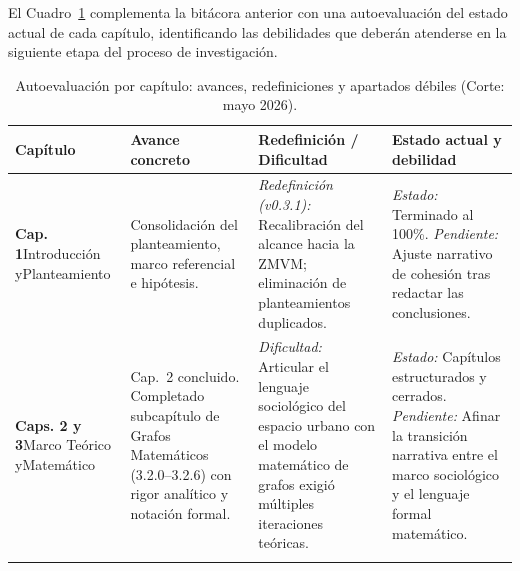 El Cuadro~\ref{tab:autoevaluacion} complementa la bitácora anterior con una
autoevaluación del estado actual de cada capítulo, identificando las debilidades
que deberán atenderse en la siguiente etapa del proceso de investigación.

\begin{table}[H]
    \centering
    \caption{Autoevaluación por capítulo: avances, redefiniciones y apartados débiles (Corte: mayo 2026).}
    \label{tab:autoevaluacion}
    \fontsize{9pt}{11.5pt}\selectfont
    \begin{tabularx}{\textwidth}{
        >{\hsize=0.55\hsize\raggedright\arraybackslash}X
        >{\hsize=1.15\hsize\raggedright\arraybackslash}X
        >{\hsize=1.15\hsize\raggedright\arraybackslash}X
        >{\hsize=1.15\hsize\raggedright\arraybackslash}X}
        \toprule
        \textbf{Capítulo} &
        \textbf{Avance concreto} &
        \textbf{Redefinición / Dificultad} &
        \textbf{Estado actual y debilidad} \\
        \midrule

        \textbf{Cap. 1}\newline Introducción y\newline Planteamiento &
        Consolidación del planteamiento, marco referencial e hipótesis. &
        \textit{Redefinición (v0.3.1):} Recalibración del alcance hacia la ZMVM;
        eliminación de planteamientos duplicados. &
        \textit{Estado:} Terminado al 100\%. \newline
        \textit{Pendiente:} Ajuste narrativo de cohesión tras redactar las conclusiones. \\
        \addlinespace\hline\addlinespace

        \textbf{Caps. 2 y 3}\newline Marco Teórico y\newline Matemático &
        Cap.~2 concluido. Completado subcapítulo de Grafos Matemáticos
        (3.2.0--3.2.6) con rigor analítico y notación formal. &
        \textit{Dificultad:} Articular el lenguaje sociológico del espacio urbano
        con el modelo matemático de grafos exigió múltiples iteraciones teóricas. &
        \textit{Estado:} Capítulos estructurados y cerrados. \newline
        \textit{Pendiente:} Afinar la transición narrativa entre el marco
        sociológico y el lenguaje formal matemático. \\
        \addlinespace\hline\addlinespace


\end{tabularx}
\end{table}
